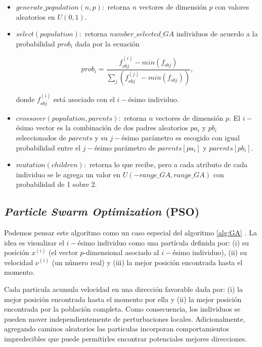 \begin{itemize}
    \item $generate\_population(n, p):$ retorna $n$ vectores de dimensión $p$
      con valores aleatorios en $U(0, 1)$.

    \item $select(population):$ retorna $number\_selected\_GA$ individuos de
      acuerdo a la probabilidad $prob_i$ dada por la ecuación
    
    \begin{equation}
      prob_i = \frac{f_{obj}^{(i)} - min(f_{obj})}{\displaystyle\sum_{j} (f_{obj}^{(j)} - min(f_{obj}))},
    \label{eq:prob}
    \end{equation}
    
    donde $f_{obj}^{(i)}$ está asociado con el $i-$ésimo individuo.
    
    \item $crossover(population, parents):$ retorna $n$ vectores de dimensión $p$.
    El $i-$ésimo vector es la combinación de dos padres aleatorios $pa_i$
    y $pb_i$ seleccionados de $parents$ y su $j-$ésimo parámetro es escogido
    con igual probabilidad entre el $j-$ésimo parámetro de $parents[pa_i]$
    y $parents[pb_i]$.

    \item $mutation(children):$ retorna lo que recibe, pero a cada atributo de
      cada individuo se le agrega un valor en $U(-range\_GA, range\_GA)$ con
      probabilidad de 1 sobre 2.

\end{itemize}

\subsection{\emph{Particle Swarm Optimization} (PSO)}

Podemos pensar este algoritmo como un caso especial del algoritmo \ref{alg:GA}
\citep{Mykel2019, Prosopio-Galarza2019}.
La idea es visualizar el $i-$ésimo individuo como una partícula definida por: 
(i) su posición $x^{(i)}$ (el vector $p$-dimensional asociado al $i-$ésimo individuo),
(ii) su velocidad $\nu^{(i)}$ (un número real) y
(iii) la mejor posición encontrada hasta el momento.

Cada particula acumula velocidad en una dirección favorable dada por: 
(i) la mejor posición encontrada hasta el momento por ella y 
(ii) la mejor posición encontrada por la población completa.
Como consecuencia, los individuos se pueden mover independientemente de
perturbaciones locales.
Adicionalmente, agregando caminos aleatorios las particulas incorporan
comportamientos impredecibles que puede permitirles encontrar potenciales
mejores direcciones.

